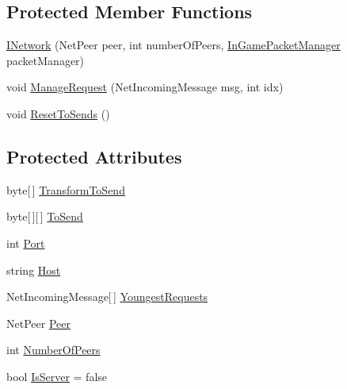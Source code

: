 \subsection*{Protected Member Functions}
\begin{DoxyCompactItemize}
\item 
\hyperlink{classgearit_1_1src_1_1_network_1_1_i_network_aa21279e8b3dd11f57990fcbd55762d50}{I\+Network} (Net\+Peer peer, int number\+Of\+Peers, \hyperlink{classgearit_1_1src_1_1_network_1_1_in_game_packet_manager}{In\+Game\+Packet\+Manager} packet\+Manager)
\item 
void \hyperlink{classgearit_1_1src_1_1_network_1_1_i_network_adffd41e505f0994a61dd4fab407ec99c}{Manage\+Request} (Net\+Incoming\+Message msg, int idx)
\item 
void \hyperlink{classgearit_1_1src_1_1_network_1_1_i_network_aaf2febc377ba887d11ae36e463079173}{Reset\+To\+Sends} ()
\end{DoxyCompactItemize}
\subsection*{Protected Attributes}
\begin{DoxyCompactItemize}
\item 
byte\mbox{[}$\,$\mbox{]} \hyperlink{classgearit_1_1src_1_1_network_1_1_i_network_ac0cf652f6985830b26baf854695e0c70}{Transform\+To\+Send}
\item 
byte\mbox{[}$\,$\mbox{]}\mbox{[}$\,$\mbox{]} \hyperlink{classgearit_1_1src_1_1_network_1_1_i_network_a0bf75c09a1063835b64d71234ec4d561}{To\+Send}
\item 
int \hyperlink{classgearit_1_1src_1_1_network_1_1_i_network_a6ce9ade4d86ad87f625827b3fb7c8af4}{Port}
\item 
string \hyperlink{classgearit_1_1src_1_1_network_1_1_i_network_a0b2fb008d89858f27d4a0b021f67e7cb}{Host}
\item 
Net\+Incoming\+Message\mbox{[}$\,$\mbox{]} \hyperlink{classgearit_1_1src_1_1_network_1_1_i_network_af6eabe64a0c59d32dad0d1429fa7e496}{Youngest\+Requests}
\item 
Net\+Peer \hyperlink{classgearit_1_1src_1_1_network_1_1_i_network_a017bd37723ae961b836fac8aa683e16f}{Peer}
\item 
int \hyperlink{classgearit_1_1src_1_1_network_1_1_i_network_add94d6cdc0a0538d9909ea412101a63d}{Number\+Of\+Peers}
\item 
bool \hyperlink{classgearit_1_1src_1_1_network_1_1_i_network_a78f0d5f94a141c1592e81542460b5020}{Is\+Server} = false
\end{DoxyCompactItemize}
